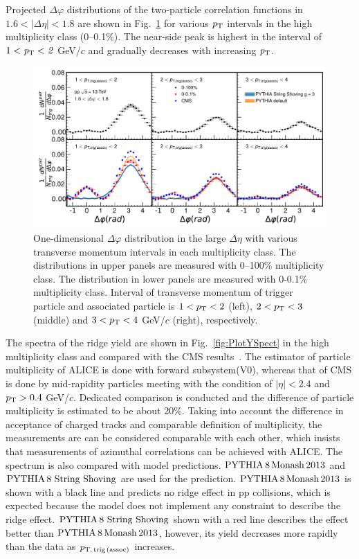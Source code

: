  Projected $\Delta\varphi$ distributions of the two-particle correlation functions in $1.6<|\Delta\eta|<1.8$ are shown in Fig.~\ref{fig:PlotDeltaPhi} for various $\it{p}_{\rm{T}}$ intervals in the high multiplicity class (0--0.1\%). The near-side peak is highest in the interval of $1<\it{p}_{\rm{T}}<2$ GeV/$c$ and gradually decreases with increasing $\it{p}_{\rm{T}}$.


\begin{figure}[h!]
	\centering
	\includegraphics[width=0.99\linewidth]{./figures/Fig2_PlotDeltaPhi.pdf}
	\caption{One-dimensional $\Delta\varphi$ distribution in the large $\Delta\eta$ with various transverse momentum intervals in each multiplicity class. The distributions in upper panels are measured with 0--100\% multiplicity class. The distribution in lower panels are measured with 0-0.1\% multiplicity class. Interval of transverse momentum of trigger particle and associated particle is $1<p_\mathrm{T}<2$ (left), $2<p_\mathrm{T}<3$ (middle) and $3<p_\mathrm{T}<4$ GeV/$c$ (right), respectively. }
	\label{fig:PlotDeltaPhi}
\end{figure}
 
The spectra of the ridge yield are shown in Fig.~\ref{fig:PlotYSpect} in the high multiplicity class and compared with the CMS results~\cite{Khachatryan:2015lva}. The estimator of particle multiplicity of ALICE is done with forward subsystem(V0), whereas that of CMS is done by mid-rapidity particles meeting with the condition of $|\eta|<$2.4 and $p_\mathrm{T}>0.4$ GeV/$c$. Dedicated comparison is conducted and the difference of particle multiplicity is estimated to be about 20\%. Taking into account the difference in acceptance of charged tracks and comparable definition of multiplicity, the measurements are can be considered comparable with each other, which insists that measurements of azimuthal correlations can be achieved with ALICE. The spectrum is also compared with model predictions. $\mathrm{PYTHIA}\,8\,\mathrm{Monash}\,2013$ and $\mathrm{PYTHIA}\,8~\mathrm{String}~\mathrm{Shoving}$ are used for the prediction. $\mathrm{PYTHIA}\,8\,\mathrm{Monash}\,2013$ is shown with a black line and predicts no ridge effect in pp collisions, which is expected because the model does not implement any constraint to describe the ridge effect. $\mathrm{PYTHIA}\,8~\mathrm{String}~\mathrm{Shoving}$ shown with a red line describes the effect better than $\mathrm{PYTHIA}\,8\,\mathrm{Monash}\,2013$, however, its yield decreases more rapidly than the data as $p_\mathrm{T,\,trig\,(assoc)}$ increases.

